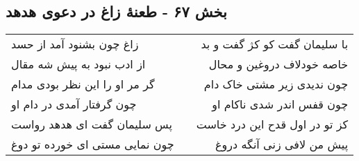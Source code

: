 \begin{center}
\section*{بخش ۶۷ - طعنهٔ زاغ در دعوی هدهد}
\label{sec:sh067}
\begin{longtable}{l p{0.5cm} r}
زاغ چون بشنود آمد از حسد
&&
با سلیمان گفت کو کژ گفت و بد
\\
از ادب نبود به پیش شه مقال
&&
خاصه خودلاف دروغین و محال
\\
گر مر او را این نظر بودی مدام
&&
چون ندیدی زیر مشتی خاک دام
\\
چون گرفتار آمدی در دام او
&&
چون قفس اندر شدی ناکام او
\\
پس سلیمان گفت ای هدهد رواست
&&
کز تو در اول قدح این درد خاست
\\
چون نمایی مستی ای خورده تو دوغ
&&
پیش من لافی زنی آنگه دروغ
\\
\end{longtable}
\end{center}
